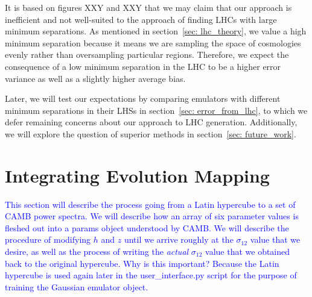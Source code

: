 It is based on figures XXY and XXY that we may claim that our approach is
inefficient and not well-suited to the approach of finding LHCs with large
minimum separations. As mentioned in section~\ref{sec: lhc_theory},
we value a high minimum separation because it means we are sampling the
space of cosmologies evenly rather than oversampling particular regions.
Therefore, we expect the consequence of a low minimum separation in the LHC to
be a higher error variance as well as a slightly higher average bias.


Later, we will test our expectations by comparing emulators with different
minimum separations in their LHSs in section~\ref{sec: error_from_lhc}, to
which we defer remaining concerns about our approach to LHC generation.
Additionally, we will explore the question of superior methods in
section~\ref{sec: future_work}.

\section{Integrating Evolution Mapping}
\label{sec: generate_emu_data}


\textcolor{blue}{This section will describe the process going from a Latin 
hypercube to a set of CAMB power spectra. We will describe how an array of six 
parameter values is fleshed out into a params object understood by CAMB. We 
will describe the procedure of modifying $h$ and $z$ until we arrive roughly 
at the $\sigma_{12}$ value that we desire, as well as the process of writing 
the \textit{actual} $\sigma_{12}$ value that we obtained back to the original 
hypercube. Why is this important? Because the Latin hypercube is used again 
later in the user\_interface.py script for the purpose of training the 
Gaussian emulator object.}

